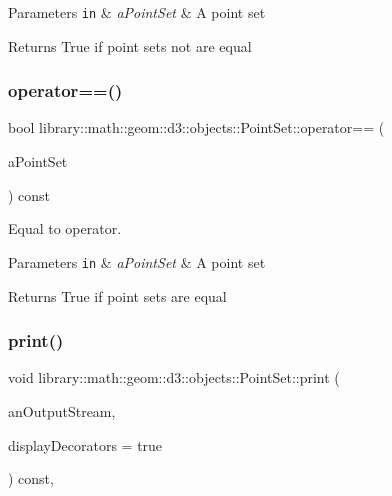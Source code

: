 \begin{DoxyParams}[1]{Parameters}
\mbox{\tt in}  & {\em a\+Point\+Set} & A point set \\
\hline
\end{DoxyParams}
\begin{DoxyReturn}{Returns}
True if point sets not are equal 
\end{DoxyReturn}
\mbox{\label{classlibrary_1_1math_1_1geom_1_1d3_1_1objects_1_1_point_set_afd9dc122c96bb0807bbe5ba6d84be519}} 
\subsubsection{\texorpdfstring{operator==()}{operator==()}}
{\footnotesize\ttfamily bool library\+::math\+::geom\+::d3\+::objects\+::\+Point\+Set\+::operator== (\begin{DoxyParamCaption}\item[{const \hyperlink{classlibrary_1_1math_1_1geom_1_1d3_1_1objects_1_1_point_set}{Point\+Set} \&}]{a\+Point\+Set }\end{DoxyParamCaption}) const}



Equal to operator. 


\begin{DoxyParams}[1]{Parameters}
\mbox{\tt in}  & {\em a\+Point\+Set} & A point set \\
\hline
\end{DoxyParams}
\begin{DoxyReturn}{Returns}
True if point sets are equal 
\end{DoxyReturn}
\mbox{\label{classlibrary_1_1math_1_1geom_1_1d3_1_1objects_1_1_point_set_ab1a24422b85249c21feb603025140c1a}} 
\subsubsection{\texorpdfstring{print()}{print()}}
{\footnotesize\ttfamily void library\+::math\+::geom\+::d3\+::objects\+::\+Point\+Set\+::print (\begin{DoxyParamCaption}\item[{std\+::ostream \&}]{an\+Output\+Stream,  }\item[{bool}]{display\+Decorators = {\ttfamily true} }\end{DoxyParamCaption}) const\hspace{0.3cm}{\ttfamily [override]}, {\ttfamily [virtual]}}



